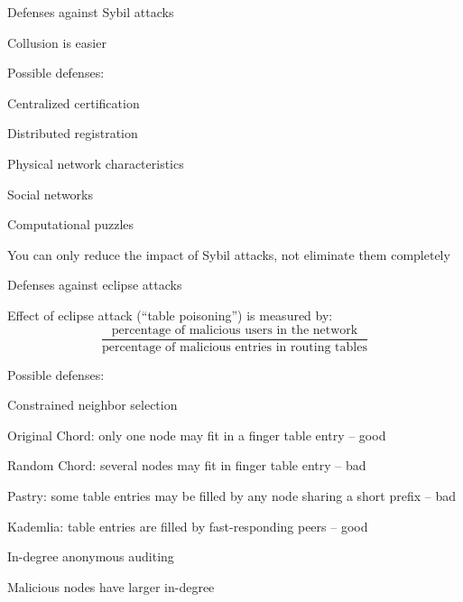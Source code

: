 \begin{frame}{Defenses against Sybil attacks}

\BIL
\item Collusion is easier 
\item Possible defenses:
	\BI
	\item Centralized certification
	\item Distributed registration
	\item Physical network characteristics
	\item Social networks
	\item Computational puzzles
	\EI
\item You can only reduce the impact of Sybil attacks, not eliminate them
completely
\EIL

\end{frame}

\begin{frame}{Defenses against eclipse attacks}

\BIL
\item Effect of eclipse attack (“\alert{table poisoning}”) is measured by:
\[
  \frac{
    \textrm{percentage of malicious users in the network}}{
	\textrm{percentage of malicious entries in routing tables}
   }
\]
\item Possible defenses:
\BI
\item Constrained neighbor selection
  \BI
  \item Original Chord: only one node may fit in a finger table entry -- good
  \item Random Chord: several nodes may fit in finger table entry -- bad
  \item Pastry: some table entries may be filled by any node sharing a short prefix -- bad
  \item Kademlia: table entries are filled by fast-responding peers -- good
  \EI
\item In-degree anonymous auditing
  \BI
  \item Malicious nodes have larger in-degree
  \EI
\EI

\EIL

\end{frame}

